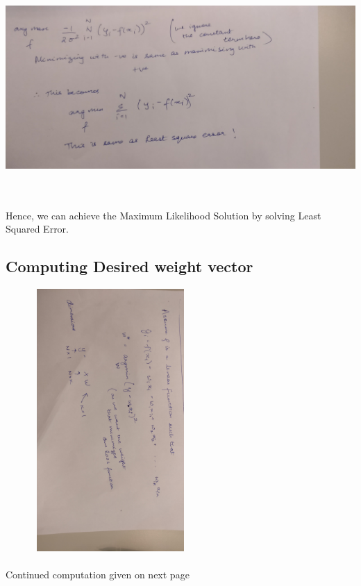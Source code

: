 \includegraphics[width=15cm,height = 8cm]{figures/log_mle.jpg}
\\
\\
Hence, we can achieve the Maximum Likelihood Solution by solving Least Squared Error.\\

\subsection{Computing Desired weight vector}
\includegraphics[width=8cm,height = 10cm, angle = 90, origin=c]{figures/compute_w_1.jpg}
\\
\\
Continued computation given on next page


